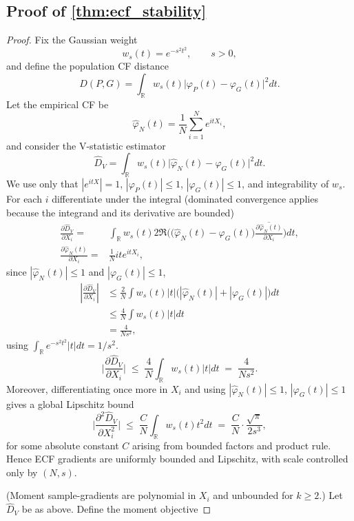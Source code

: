 \subsection{Proof of \cref{thm:ecf_stability}}
\label{proof:ecf_stability}
\begin{proof}

Fix the Gaussian weight
\[
w_s(t)=e^{-s^2 t^2},\qquad s>0,
\]
and define the population CF distance
\[
D(P,G)=\int_{\mathbb{R}} w_s(t)\big|\varphi_P(t)-\varphi_G(t)\big|^2dt.
\]
Let the empirical CF be
\[
\widehat{\varphi}_N(t)=\frac{1}{N}\sum_{i=1}^N e^{itX_i},
\]
and consider the V-statistic estimator
\[
\widehat{D}_V=\int_{\mathbb{R}} w_s(t)\big|\widehat{\varphi}_N(t)-\varphi_G(t)\big|^2dt.
\]
We use only that $|e^{itX}|=1$, $|\varphi_P(t)|\le 1$, $|\varphi_G(t)|\le 1$, and integrability of $w_s$.
For each $i$ differentiate under the integral (dominated convergence applies because the integrand and its derivative are bounded)
\begin{align*}
\frac{\partial \widehat{D}_V}{\partial X_i}
=& \int_{\mathbb{R}} w_s(t)2\Re\!\Big(\big(\widehat{\varphi}_N(t)-\varphi_G(t)\big)\overline{\frac{\partial \widehat{\varphi}_N(t)}{\partial X_i}}\Big)dt,\\
\frac{\partial \widehat{\varphi}_N(t)}{\partial X_i}
=& \frac{1}{N}i te^{itX_i},\end{align*}
since $|\widehat{\varphi}_N(t)|\le 1$ and $|\varphi_G(t)|\le 1$,
\begin{align*}
\left|\frac{\partial \widehat{D}_V}{\partial X_i}\right|
&\le \frac{2}{N}\int w_s(t)|t|\big(|\widehat{\varphi}_N(t)|+|\varphi_G(t)|\big)dt\\
&\le \frac{4}{N}\int w_s(t)|t|dt\\
&= \frac{4}{Ns^2},
\end{align*}
using $\int_{\mathbb{R}} e^{-s^2 t^2}|t|dt=1/s^2$. 
\[
\Bigg|\frac{\partial \widehat{D}_V}{\partial X_i}\Bigg|
\;\le\;\frac{4}{N}\int_{\mathbb{R}} w_s(t)|t|dt
\;=\; \frac{4}{Ns^2}.
\]
Moreover, differentiating once more in $X_i$ and using $|\widehat{\varphi}_N(t)|\le 1$, $|\varphi_G(t)|\le 1$ gives a global Lipschitz bound
\[
\Bigg|\frac{\partial^2 \widehat{D}_V}{\partial X_i^2}\Bigg|
\;\le\; \frac{C}{N}\int_{\mathbb{R}} w_s(t)t^2dt
\;=\; \frac{C}{N}\cdot \frac{\sqrt{\pi}}{2s^3},
\]
for some absolute constant $C$ arising from bounded factors and product rule. Hence ECF gradients are uniformly bounded and Lipschitz, with scale controlled only by $(N,s)$.
\item[(B)] (Moment sample-gradients are polynomial in $X_i$ and unbounded for $k\ge 2$.) Let $\widehat{D}_V$ be as above. Define the moment objective

\end{proof}
